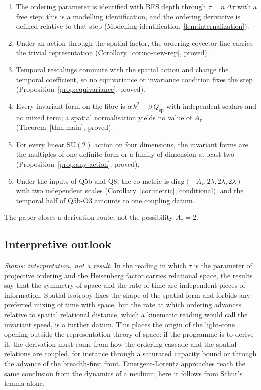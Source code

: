 \documentclass[12pt,a4paper]{article}
\newcommand{\SU}{\mathrm{SU}}
\newcommand{\Qsp}{Q_{\mathrm{sp}}}
\begin{document}
      \begin{enumerate}
        \item The ordering parameter is identified with BFS depth through $\tau = n\,\Delta\tau$ with a free step; this
        is a modelling identification, and the ordering derivative is defined relative to that step
        (Modelling identification~\ref{lem:internalization}).
        \item Under an action through the spatial factor, the ordering covector line carries the trivial
        representation (Corollary~\ref{cor:no-new-rep}, proved).
        \item Temporal rescalings commute with the spatial action and change the temporal coefficient, so no
        equivariance or invariance condition fixes the step (Proposition~\ref{prop:equivariance}, proved).
        \item Every invariant form on the fibre is $\alpha\,k_\tau^2 + \beta\,\Qsp$ with independent scalars and no
        mixed term; a spatial normalisation yields no value of $A_\tau$ (Theorem~\ref{thm:main}, proved).
        \item For every linear $\SU(2)$ action on four dimensions, the invariant forms are the multiples of one definite
        form or a family
        of dimension at least two (Proposition~\ref{prop:any-action}, proved).
        \item Under the inputs of Q5b and Q8, the co-metric is $\mathrm{diag}(-A_\tau, 2\lambda, 2\lambda, 2\lambda)$
        with two independent scales (Corollary~\ref{cor:metric}, conditional), and the temporal half of Q5b-O3
        amounts to one coupling datum.
      \end{enumerate}

      The paper closes a derivation route, not the possibility $A_\tau = 2$.

    \subsection{Interpretive outlook}

      \emph{Status: interpretation, not a result.}
      In the reading in which $\tau$ is the parameter of projective ordering and the Heisenberg factor carries
      relational space, the results say that the symmetry of space and the rate of time are independent pieces of
      information.
      Spatial isotropy fixes the shape of the spatial form and forbids any preferred mixing of time with space, but the
      rate at which ordering advances relative to spatial relational distance, which a kinematic reading would call
      the invariant speed, is a further datum.
      This places the origin of the light-cone opening outside the representation theory of space: if the programme
      is to derive it, the derivation must come from how the ordering cascade and the spatial relations are coupled,
      for instance through a saturated capacity bound or through the advance of the breadth-first front.
      Emergent-Lorentz approaches reach the same conclusion from the dynamics of a medium; here it follows from Schur's
      lemma alone.
\end{document}
